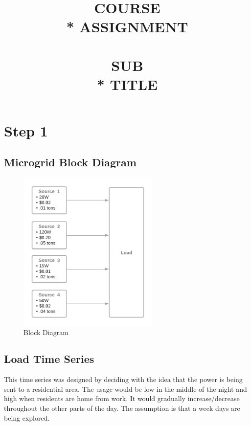 \documentclass{article}
\title{\Huge{\textbf{COURSE}  \\* ASSIGNMENT \\~\\ \textbf{SUB \\* TITLE}}}
\date{} %
\begin{document}


\setcounter{secnumdepth}{-1}

\section{Step 1}
    \subsection{Microgrid Block Diagram}
    \begin{figure}[h!]
    \begin{center}
        \includegraphics[height=8cm]{graphics/block_diagram.png}
    \end{center}
    \caption{Block Diagram}
    \label{fig:block}
    \end{figure}

    \subsection{Load Time Series}
    This time series was designed by deciding with the idea that the power is being sent to a residential area.  The usage would be low in the middle
    of the night and high when residents are home from work.  It would gradually
    increase/decrease throughout the other parts of the day.  The assumption
    is that a week days are being explored.
\end{document}
